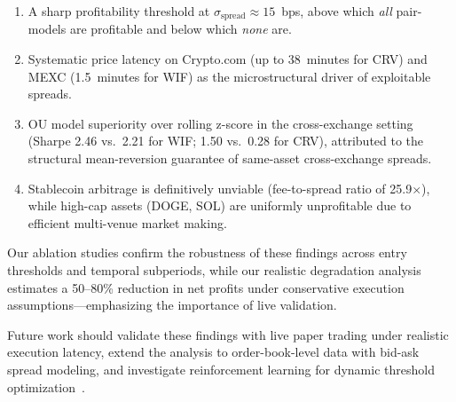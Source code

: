 \documentclass[sigconf,nonacm=false]{acmart}
\begin{document}
\begin{enumerate}
    \item A sharp profitability threshold at $\sigma_{\text{spread}} \approx 15$~bps, above which \emph{all} pair-models are profitable and below which \emph{none} are.
    \item Systematic price latency on Crypto.com (up to 38~minutes for CRV) and MEXC (1.5~minutes for WIF) as the microstructural driver of exploitable spreads.
    \item OU model superiority over rolling z-score in the cross-exchange setting (Sharpe 2.46 vs.\ 2.21 for WIF; 1.50 vs.\ 0.28 for CRV), attributed to the structural mean-reversion guarantee of same-asset cross-exchange spreads.
    \item Stablecoin arbitrage is definitively unviable (fee-to-spread ratio of 25.9$\times$), while high-cap assets (DOGE, SOL) are uniformly unprofitable due to efficient multi-venue market making.
\end{enumerate}

Our ablation studies confirm the robustness of these findings across entry thresholds and temporal subperiods, while our realistic degradation analysis estimates a 50--80\% reduction in net profits under conservative execution assumptions---emphasizing the importance of live validation.

Future work should validate these findings with live paper trading under realistic execution latency, extend the analysis to order-book-level data with bid-ask spread modeling, and investigate reinforcement learning for dynamic threshold optimization~\cite{ning2024advanced, carapeto2024deep}.



\end{document}

